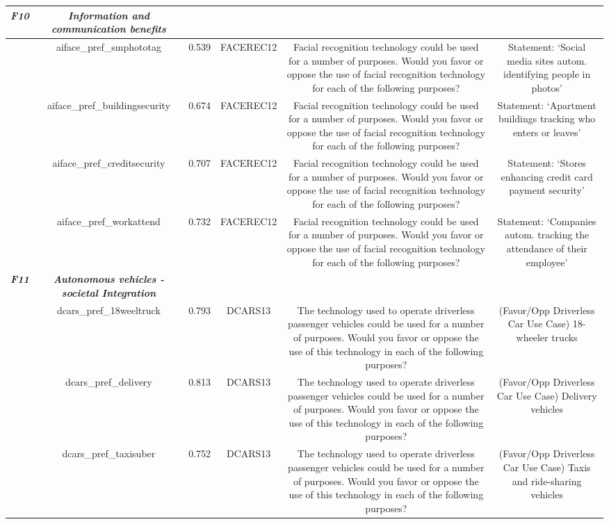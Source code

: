 {\begin{tabular}{c | c | c | c | c | c}
  \hline
  \textit{\textbf{F10}} & \textit{\textbf{Information and communication benefits }} \\
  \hline
   & aiface\_pref\_smphototag & 0.539 & FACEREC12 & Facial recognition technology could be used for a number of purposes. Would you favor or oppose the use of facial recognition technology for each of the following purposes? & Statement: ‘Social media sites autom. identifying people in photos’ \\
  \hline
   & aiface\_pref\_buildingsecurity & 0.674 & FACEREC12 & Facial recognition technology could be used for a number of purposes. Would you favor or oppose the use of facial recognition technology for each of the following purposes? & Statement: ‘Apartment buildings tracking who enters or leaves’ \\
  \hline
   & aiface\_pref\_creditsecurity & 0.707 & FACEREC12 & Facial recognition technology could be used for a number of purposes. Would you favor or oppose the use of facial recognition technology for each of the following purposes? & Statement: ‘Stores enhancing credit card payment security’ \\
  \hline
  \textit{ } & aiface\_pref\_workattend & 0.732 & FACEREC12 & Facial recognition technology could be used for a number of purposes. Would you favor or oppose the use of facial recognition technology for each of the following purposes? & Statement: ‘Companies autom. tracking the attendance of their employee’ \\
  \hline
  \textit{\textbf{F11}} & \textit{\textbf{Autonomous vehicles - societal Integration}} \\
  \hline
   & dcars\_pref\_18weeltruck & 0.793 & DCARS13 & The technology used to operate driverless passenger vehicles could be used for a number of purposes. Would you favor or oppose the use of this technology in each of the
following purposes? & (Favor/Opp Driverless Car Use Case) 18-wheeler trucks \\
  \hline
   & dcars\_pref\_delivery & 0.813 & DCARS13 & The technology used to operate driverless passenger vehicles could be used for a number of purposes. Would you favor or oppose the use of this technology in each of the
following purposes? & (Favor/Opp Driverless Car Use Case) Delivery vehicles \\
  \hline
   & dcars\_pref\_taxisuber & 0.752 & DCARS13 & The technology used to operate driverless passenger vehicles could be used for a number of purposes. Would you favor or oppose the use of this technology in each of the
following purposes? & (Favor/Opp Driverless Car Use Case) Taxis and ride-sharing vehicles \\

\end{tabular}}
